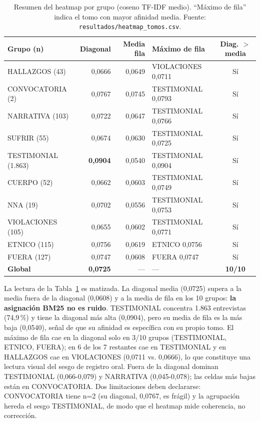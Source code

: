 \documentclass[11pt]{tg_usta}
\begin{document}
\begin{table}[htbp]
    \centering
    \caption{Resumen del heatmap por grupo (coseno TF-IDF medio). ``Máximo de fila'' indica el tomo con mayor afinidad media. Fuente: \texttt{resultados/heatmap\_tomos.csv}.}
    \footnotesize
    \setlength{\tabcolsep}{5pt}
    \begin{tabular}{l r r l c}
    \toprule
    Grupo (n) & Diagonal & Media fila & Máximo de fila & Diag. $>$ media \\
    \midrule
    HALLAZGOS (43) & 0,0666 & 0,0649 & VIOLACIONES 0,0711 & Sí \\
    CONVOCATORIA (2) & 0,0767 & 0,0745 & TESTIMONIAL 0,0793 & Sí \\
    NARRATIVA (103) & 0,0722 & 0,0647 & TESTIMONIAL 0,0766 & Sí \\
    SUFRIR (55) & 0,0674 & 0,0630 & TESTIMONIAL 0,0725 & Sí \\
    TESTIMONIAL (1.863) & \textbf{0,0904} & 0,0540 & TESTIMONIAL 0,0904 & Sí \\
    CUERPO (52) & 0,0662 & 0,0603 & TESTIMONIAL 0,0749 & Sí \\
    NNA (19) & 0,0702 & 0,0556 & TESTIMONIAL 0,0753 & Sí \\
    VIOLACIONES (105) & 0,0655 & 0,0602 & TESTIMONIAL 0,0771 & Sí \\
    ETNICO (115) & 0,0756 & 0,0619 & ETNICO 0,0756 & Sí \\
    FUERA (127) & 0,0747 & 0,0608 & FUERA 0,0747 & Sí \\
    \midrule
    \textbf{Global} & \textbf{0,0725} & --- & --- & \textbf{10/10} \\
    \bottomrule
    \end{tabular}
    \label{tab:heatmap}
\end{table}

La lectura de la Tabla~\ref{tab:heatmap} es matizada. La diagonal media (0,0725) supera a la media fuera de la diagonal (0,0608) y a la media de fila en los 10 grupos: \textbf{la asignación BM25 no es ruido}. TESTIMONIAL concentra 1.863 entrevistas (74,9\,\%) y tiene la diagonal más alta (0,0904), pero su media de fila es la más baja (0,0540), señal de que su afinidad es específica con su propio tomo. El máximo de fila cae en la diagonal solo en 3/10 grupos (TESTIMONIAL, ETNICO, FUERA); en 6 de los 7 restantes cae en TESTIMONIAL y en HALLAZGOS cae en VIOLACIONES (0,0711 vs. 0,0666), lo que constituye una lectura visual del sesgo de registro oral. Fuera de la diagonal dominan TESTIMONIAL (0,066-0,079) y NARRATIVA (0,045-0,078); las celdas más bajas están en CONVOCATORIA. Dos limitaciones deben declararse: CONVOCATORIA tiene n=2 (su diagonal, 0,0767, es frágil) y la agrupación hereda el sesgo TESTIMONIAL, de modo que el heatmap mide coherencia, no corrección.
\end{document}
